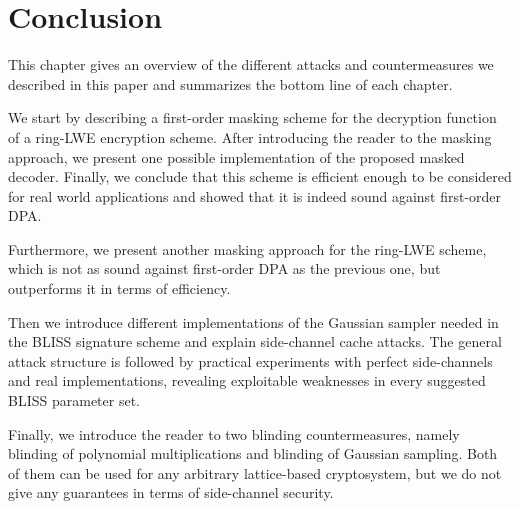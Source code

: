 \chapter{Conclusion}
This chapter gives an overview of the different attacks and countermeasures we described in this paper and summarizes the bottom line of each chapter.

We start by describing a first-order masking scheme for the decryption function of a \ac{ring-LWE} encryption scheme. After introducing the reader to the masking approach, we present one possible implementation of the proposed masked decoder. Finally, we conclude that this scheme is efficient enough to be considered for real world applications and showed that it is indeed sound against first-order \ac{DPA}.

Furthermore, we present another masking approach for the \ac{ring-LWE} scheme, which is not as sound against first-order \ac{DPA} as the previous one, but outperforms it in terms of efficiency.

Then we introduce different implementations of the Gaussian sampler needed in the \ac{BLISS} signature scheme and explain side-channel cache attacks. The general attack structure is followed by practical experiments with perfect side-channels and real implementations, revealing exploitable weaknesses in every suggested \ac{BLISS} parameter set.

Finally, we introduce the reader to two blinding countermeasures, namely blinding of polynomial multiplications and blinding of Gaussian sampling. Both of them can be used for any arbitrary lattice-based cryptosystem, but we do not give any guarantees in terms of side-channel security.


